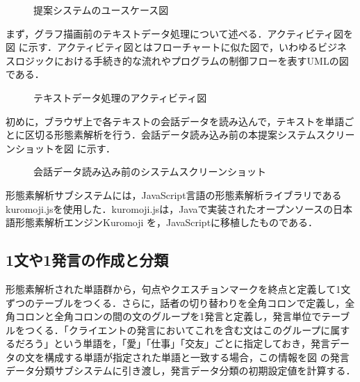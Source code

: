 \documentclass[shuuron]{kuee}
\begin{document}
\begin{figure}
   \begin{center}
   \end{center}
   \caption{提案システムのユースケース図}
   \label{fig:use_case_diagram}
 \end{figure}


まず，グラフ描画前のテキストデータ処理について述べる．アクティビティ図を図
に示す．アクティビティ図とはフローチャートに似た図で，いわゆるビジネスロジックにおける手続き的な流れやプログラムの制御フローを表すUMLの図である．
\begin{figure}
   \begin{center}
   \end{center}
   \caption{テキストデータ処理のアクティビティ図}
   \label{fig:activity}
\end{figure}


初めに，ブラウザ上で各テキストの会話データを読み込んで，テキストを単語ごとに区切る形態素解析を行う．会話データ読み込み前の本提案システムスクリーンショットを図
に示す．
 \begin{figure}
   \begin{center}
   \end{center}
   \caption{会話データ読み込み前のシステムスクリーンショット}
   \label{fig:yomikomimae2}
 \end{figure}
形態素解析サブシステムには，JavaScript言語の形態素解析ライブラリであるkuromoji.js\cite{kuromojijs}を使用した．kuromoji.jsは，Javaで実装されたオープンソースの日本語形態素解析エンジンKuromoji
を，JavaScriptに移植したものである．

\subsection{1文や1発言の作成と分類}
形態素解析された単語群から，句点やクエスチョンマークを終点と定義して1文ずつのテーブルをつくる．さらに，話者の切り替わりを全角コロンで定義し，全角コロンと全角コロンの間の文のグループを1発言と定義し，発言単位でテーブルをつくる．「クライエントの発言においてこれを含む文はこのグループに属するだろう」という単語を，「愛」「仕事」「交友」ごとに指定しておき，発言データの文を構成する単語が指定された単語と一致する場合，この情報を図
の発言データ分類サブシステムに引き渡し，発言データ分類の初期設定値を計算する．
\end{document}
